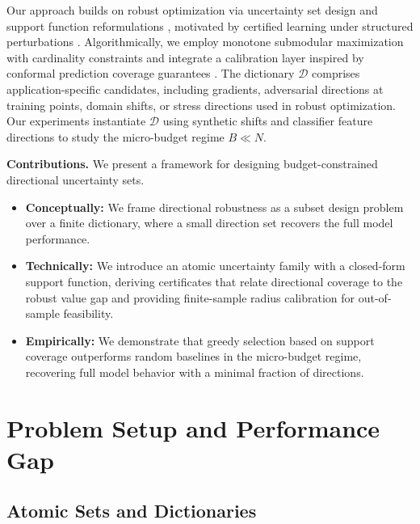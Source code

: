 \documentclass[accepted]{uai2026}
\theoremstyle{plain}
\theoremstyle{definition}
\theoremstyle{remark}
\begin{document}
Our approach builds on robust optimization via uncertainty set design and support function reformulations \citep{BenTal1998, ElGhaoui1997, Bertsimas2004, Bertsimas2011}, motivated by certified learning under structured perturbations \citep{Szegedy2014, Goodfellow2015, Madry2018, Wong2018, Raghunathan2018, Cohen2019, Engstrom2019}. Algorithmically, we employ monotone submodular maximization with cardinality constraints \citep{Nemhauser1978, Krause2014} and integrate a calibration layer inspired by conformal prediction coverage guarantees \citep{Vovk2005, Shafer2008, Lei2018, Romano2019}.
The dictionary $\mathcal D$ comprises application-specific candidates, including gradients, adversarial directions at training points, domain shifts, or stress directions used in robust optimization. Our experiments instantiate $\mathcal D$ using synthetic shifts and classifier feature directions to study the micro-budget regime $B \ll N$.

\textbf{Contributions.}
We present a framework for designing budget-constrained directional uncertainty sets.
\begin{itemize}[leftmargin=*, topsep=2pt, itemsep=2pt, parsep=0pt]
\item \textbf{Conceptually:} We frame directional robustness as a subset design problem over a finite dictionary, where a small direction set recovers the full model performance.
\item \textbf{Technically:} We introduce an atomic uncertainty family with a closed-form support function, deriving certificates that relate directional coverage to the robust value gap and providing finite-sample radius calibration for out-of-sample feasibility.
\item \textbf{Empirically:} We demonstrate that greedy selection based on support coverage outperforms random baselines in the micro-budget regime, recovering full model behavior with a minimal fraction of directions.
\end{itemize}
\section{Problem Setup and Performance Gap}

\subsection{Atomic Sets and Dictionaries}
\label{sec:formulation}
\end{document}
